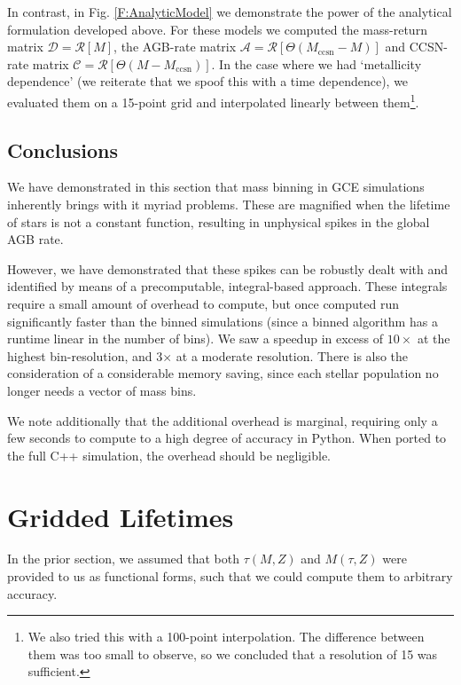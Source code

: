 \documentclass[a4paper,11pt]{article}
\begin{document}
				In contrast, in Fig. \ref{F:AnalyticModel} we demonstrate the power of the analytical formulation developed above. For these models we computed the mass-return matrix $\mathcal{D} = \mathcal{R}[M]$, the AGB-rate matrix $\mathcal{A} = \mathcal{R}[\Theta(M_\text{ccsn} - M)]$ and CCSN-rate matrix $\mathcal{C} = \mathcal{R}[\Theta(M - M_\text{ccsn})]$. In the case where we had `metallicity dependence' (we reiterate that we spoof this with a time dependence), we evaluated them on a 15-point grid and interpolated linearly between them\footnote{We also tried this with a 100-point interpolation. The difference between them was too small to observe, so we concluded that a resolution of 15 was sufficient.}. 

		\subsection{Conclusions}

			We have demonstrated in this section that mass binning in GCE simulations inherently brings with it myriad problems. These are magnified when the lifetime of stars is not a constant function, resulting in unphysical spikes in the global AGB rate.

			However, we have demonstrated that these spikes can be robustly dealt with and identified by means of a precomputable, integral-based approach. These integrals require a small amount of overhead to compute, but once computed run significantly faster than the binned simulations (since a binned algorithm has a runtime linear in the number of bins). We saw a speedup in excess of $10\times$ at the highest bin-resolution, and 3$\times$ at a moderate resolution. There is also the consideration of a considerable memory saving, since each stellar population no longer needs a vector of mass bins.  

			We note additionally that the additional overhead is marginal, requiring only a few seconds to compute to a high degree of accuracy in Python. When ported to the full C++ simulation, the overhead should be negligible. 
	\section{Gridded Lifetimes}\label{S:Interpolation}
	
		In the prior section, we assumed that both $\tau(M,Z)$ and $M(\tau,Z)$ were provided to us as functional forms, such that we could compute them to arbitrary accuracy. 
\end{document}
